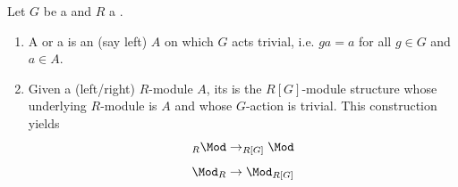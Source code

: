 \begin{definition} \label{definition:trivial_G_module_of_a_group_over_a_ring}
Let $G$ be a  and $R$ a .
\begin{enumerate}
    \item A  or a  is an  (say left) $A$ on which $G$ acts trivial, i.e. $ga = a$ for all $g \in G$ and $a \in A$.

    \item Given a (left/right) $R$-module $A$, its  is the $R[G]$-module structure whose underlying $R$-module is $A$ and whose $G$-action is trivial. This construction yields 
    $$_{R} \Mod \to _{R[G]} \Mod$$
    $$\Mod_{R} \to \Mod_{R[G]}$$
\end{enumerate}
\end{definition}